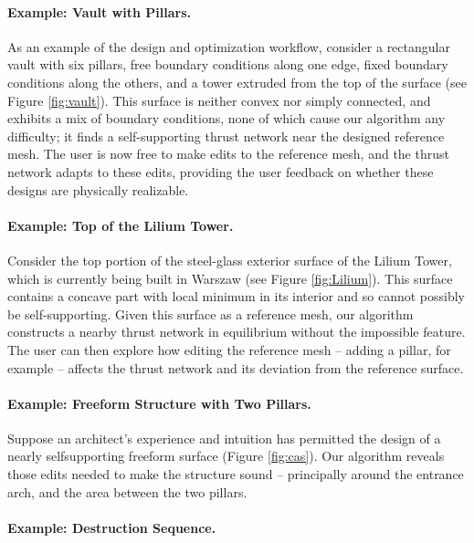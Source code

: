 \documentclass[review]{acmsiggraph}
\begin{document}
\paragraph{Example: Vault with Pillars.} 

As an example of the design and 
optimization workflow, consider a rectangular vault with six pillars, free 
boundary conditions along one edge, fixed boundary conditions along the 
others, and a tower extruded from the top of the surface (see Figure 
\ref{fig:vault}). This surface is neither convex nor simply connected, and 
exhibits a mix of boundary conditions, none of which cause our algorithm 
any difficulty; it finds a self-supporting thrust network near the 
designed reference mesh. The user is now free to make edits to the 
reference mesh, and the thrust network adapts to these edits, providing 
the user feedback on whether these designs are physically realizable.


\paragraph{Example: Top of the Lilium Tower.}

Consider the top portion of the steel-glass exterior surface of the Lilium 
Tower, which is currently being built in Warszaw (see Figure 
\ref{fig:Lilium}). This surface contains a concave part with local minimum 
in its interior and so cannot possibly be self-supporting. Given this 
surface as a reference mesh, our algorithm constructs a nearby thrust 
network in equilibrium without the impossible feature. The user can then 
explore how editing the reference mesh -- adding a pillar, for example -- 
affects the thrust network and its deviation from the reference surface.

\paragraph{Example: Freeform Structure with Two Pillars.}

Suppose an architect's experience and intuition has permitted the design 
of a nearly self\dash supporting freeform surface (Figure \ref{fig:cas}).
Our algorithm reveals those edits needed to make the 
structure sound -- principally around the entrance arch, and the area 
between the two pillars.

\paragraph{Example: Destruction Sequence.}
\end{document}
